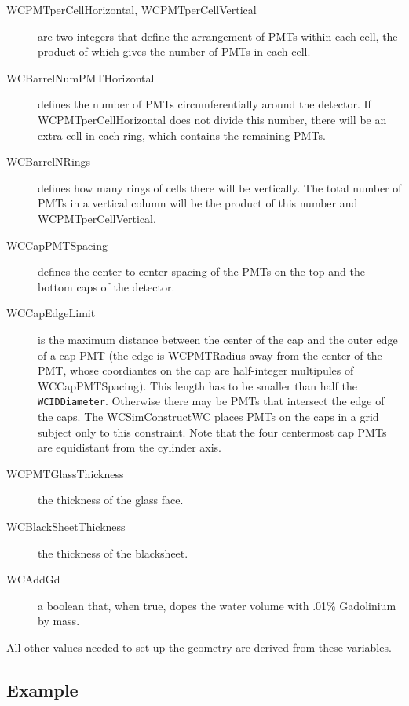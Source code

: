 \begin{description}
\item[WCPMTperCellHorizontal, WCPMTperCellVertical] are two integers that define the arrangement of PMTs within each cell, the product of which gives the number of PMTs in each cell.

\item[WCBarrelNumPMTHorizontal] defines the number of PMTs circumferentially around the detector. If WCPMTperCellHorizontal does not divide this number, there will be an extra cell in each ring, which contains the remaining PMTs.

\item[WCBarrelNRings] defines how many rings of cells there will be vertically.  The total number of PMTs in a vertical column will be the product of this number and WCPMTperCellVertical.

\item[WCCapPMTSpacing] defines the center-to-center spacing of the PMTs on the top and the bottom caps of the detector.

\item[WCCapEdgeLimit] is the maximum distance between the center of the cap and the outer edge of a cap PMT (the edge is WCPMTRadius away from the center of the PMT, whose coordiantes on the cap are half-integer multipules of WCCapPMTSpacing). This length has to be smaller than half the \texttt{WCIDDiameter}. Otherwise there may be PMTs that intersect the edge of the caps.  The WCSimConstructWC places PMTs on the caps in a grid subject only to this constraint.  Note that the four centermost cap PMTs are equidistant from the cylinder axis.

\item[WCPMTGlassThickness] the thickness of the glass face.

\item[WCBlackSheetThickness] the thickness of the blacksheet.

\item[WCAddGd] a boolean that, when true, dopes the water volume with .01\% Gadolinium by mass.
\end {description}

All other values needed to set up the geometry are derived from these variables.

\subsection{Example}

